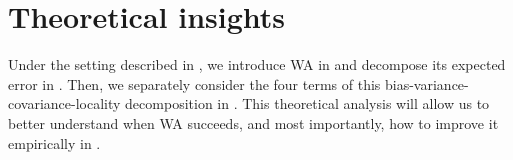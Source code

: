 \section{Theoretical insights}
\label{sec:theory}
Under the setting described in , we introduce WA in  and decompose its expected \ood error in .
Then, we separately consider the four terms of this bias-variance-covariance-locality decomposition in .
This theoretical analysis will allow us to better understand when WA succeeds, and most importantly, how to improve it empirically in .%
